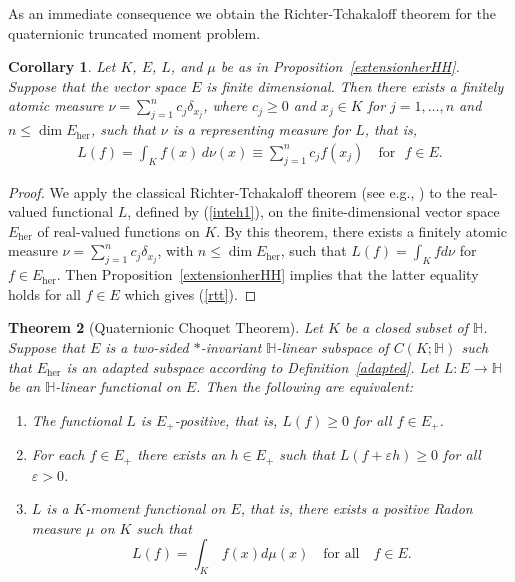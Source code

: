 \documentclass[11pt,a4paper]{amsart}
\newtheorem{theorem}{Theorem}[section]
\newtheorem{corollary}[theorem]{Corollary}
\theoremstyle{definition}
\begin{document}
As an immediate consequence we obtain the Richter-Tchakaloff theorem for
the quaternionic truncated moment problem.
%
\begin{corollary}%
\label{richter}
Let $K$, $E$, $L$, and $\mu $ be as in Proposition~\ref{extensionherHH}. Suppose that the vector space $E$ is finite dimensional.
Then there exists a finitely atomic measure
$\nu =\sum _{j=1}^{n} c_{j}\delta _{x_{j}}$, where $c_{j}\geq 0$ and
$x_{j}\in K$ for $j=1,\dots ,n$ and $n\leq \dim E_{\mathrm{her}}$, such
that $\nu $ is a representing measure for $L$, that is,
%
\begin{align}
\label{rtt}
L(f)=\int _{K} f(x)\, d\nu (x)\equiv \sum _{j=1}^{n} c_{j} f(x_{j})
\quad \textrm{for}~~~ f\in E.
\end{align}
%
\end{corollary}
%
\begin{proof}
We apply the classical Richter-Tchakaloff theorem (see e.g.,
\cite[Theorem 1.24]{Schmudgen2017}) to the real-valued functional
$L$, defined by (\ref{inteh1}), on the finite-dimensional vector space
$E_{\mathrm{her}}$ of real-valued functions on $K$. By this theorem, there
exists a finitely atomic measure
$\nu =\sum _{j=1}^{n} c_{j}\delta _{x_{j}}$, with
$n\leq \dim E_{\mathrm{her}}$, such that $L(f)=\int _{K} f d\nu $ for
$f\in E_{\mathrm{her}}$. Then Proposition~\ref{extensionherHH} implies
that the latter equality holds for all $f\in E$ which gives (\ref{rtt}).
\end{proof}
%
\begin{theorem}[Quaternionic Choquet Theorem]%
\label{quatchoquet}%
 Let $K$ be a closed subset of
$\mathbb{H}$. Suppose that $E$ is a two-sided $*$-invariant
$\mathbb{H}$-linear subspace of $C(K; \mathbb{H})$ such that
$E_{\mathrm{her}}$ is an adapted subspace according to Definition~\ref{adapted}. Let $L:E \to \mathbb{H}$ be an $\mathbb{H}$-linear functional
on $E$. Then the following are equivalent:
%
\begin{enumerate}
%
\item[\emph{(i)}] The functional $L$ is $E_{+}$-positive, that is,
$L(f)\geq 0$ for all $f\in E_{+}$.
%
\item[\emph{(ii)}] For each $f\in E_{+}$ there exists an $h\in E_{+}$ such
that $L(f+\varepsilon h)\geq 0$  for all $\varepsilon >0$.
%
\item[\emph{(iii)}] $L$ is a $K$-moment functional on $E$, that is, there
exists a positive Radon measure $\mu $ on $K$ such that
%
\begin{equation}
\label{inteh}
L(f) = \int _{K}\, f(x) d\mu (x)\quad \text{for all}\quad f \in E.
\end{equation}
%
\end{enumerate}
%
\end{theorem}
\end{document}
